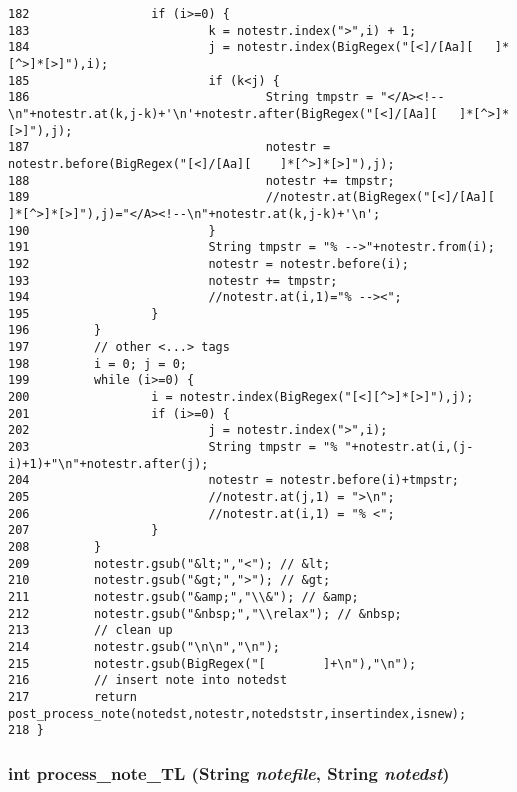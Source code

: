 \begin{verbatim}
182                 if (i>=0) {
183                         k = notestr.index(">",i) + 1;
184                         j = notestr.index(BigRegex("[<]/[Aa][   ]*[^>]*[>]"),i);
185                         if (k<j) {
186                                 String tmpstr = "</A><!--\n"+notestr.at(k,j-k)+'\n'+notestr.after(BigRegex("[<]/[Aa][   ]*[^>]*[>]"),j);
187                                 notestr = notestr.before(BigRegex("[<]/[Aa][    ]*[^>]*[>]"),j);
188                                 notestr += tmpstr;
189                                 //notestr.at(BigRegex("[<]/[Aa][        ]*[^>]*[>]"),j)="</A><!--\n"+notestr.at(k,j-k)+'\n';
190                         }
191                         String tmpstr = "% -->"+notestr.from(i);
192                         notestr = notestr.before(i);
193                         notestr += tmpstr;
194                         //notestr.at(i,1)="% --><";
195                 }
196         }
197         // other <...> tags
198         i = 0; j = 0;
199         while (i>=0) {
200                 i = notestr.index(BigRegex("[<][^>]*[>]"),j);
201                 if (i>=0) {
202                         j = notestr.index(">",i);
203                         String tmpstr = "% "+notestr.at(i,(j-i)+1)+"\n"+notestr.after(j);
204                         notestr = notestr.before(i)+tmpstr;
205                         //notestr.at(j,1) = ">\n";
206                         //notestr.at(i,1) = "% <";
207                 }
208         }
209         notestr.gsub("&lt;","<"); // &lt;
210         notestr.gsub("&gt;",">"); // &gt;
211         notestr.gsub("&amp;","\\&"); // &amp;
212         notestr.gsub("&nbsp;","\\relax"); // &nbsp;
213         // clean up
214         notestr.gsub("\n\n","\n");
215         notestr.gsub(BigRegex("[        ]+\n"),"\n");
216         // insert note into notedst
217         return post_process_note(notedst,notestr,notedststr,insertindex,isnew);
218 }
\end{verbatim}\normalsize 
{}
\subsubsection{\setlength{\rightskip}{0pt plus 5cm}int process\_\-note\_\-TL ({\bf String} {\em notefile}, {\bf String} {\em notedst})}\label{dil2al_8hh_a332}




